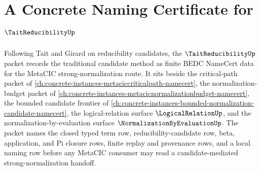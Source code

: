 \chapter{A Concrete Naming Certificate for $\TaitReducibilityUp$}
\label{ch:concrete-instances-tait-reducibility-namecert}

Following Tait and Girard on reducibility candidates, the $\TaitReducibilityUp$ packet records the traditional candidate method as finite BEDC NameCert data for the MetaCIC strong-normalization route. It sits beside the critical-path packet of \autoref{ch:concrete-instances-metaciccriticalpath-namecert}, the normalization-budget packet of \autoref{ch:concrete-instances-metacicnormalizationbudget-namecert}, the bounded candidate frontier of \autoref{ch:concrete-instances-bounded-normalization-candidate-namecert}, the logical-relation surface $\LogicalRelationUp$, and the normalization-by-evaluation surface $\NormalizationByEvaluationUp$. The packet names the closed typed term row, reducibility-candidate row, beta, application, and Pi closure rows, finite replay and provenance rows, and a local naming row before any MetaCIC consumer may read a candidate-mediated strong-normalization handoff.


